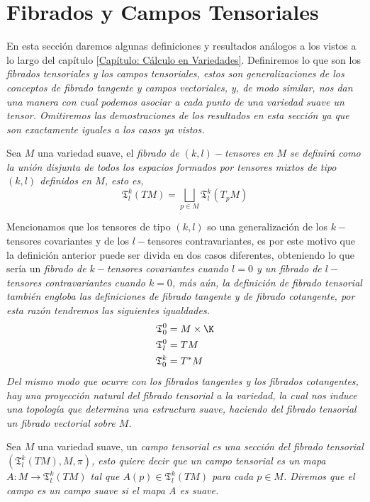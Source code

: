 \section{Fibrados y Campos Tensoriales}\label{Sección: Campos Tensoriales}
En esta sección daremos algunas definiciones y resultados análogos a los
vistos a lo largo del capítulo \ref{Capítulo: Cálculo en Variedades}.
Definiremos lo que son los \it{fibrados tensoriales} y los \it{campos
	tensoriales}, estos son generalizaciones de los conceptos de fibrado tangente y
campos vectoriales, y, de modo similar, nos dan una manera con cual podemos
asociar a cada punto de una variedad suave un tensor. Omitiremos las
demostraciones de los resultados en esta sección ya que son exactamente iguales
a los casos ya vistos.

\begin{definition}
	Sea $M$ una variedad suave, el \it{fibrado de $(k,l)-$tensores en
		$M$} se definirá como la unión disjunta de todos los espacios formados por
	tensores mixtos	de tipo $(k,l)$ definidos en $M$, esto es,
	\[
		\mathfrak{T}^{k}_{l}(TM) = \bigsqcup_{p \in M} \mathfrak{T}^{k}_{l}(T_{p}M)
	\]
\end{definition}

Mencionamos que los tensores de tipo $(k,l)$ so una generalización de los
$k-$tensores covariantes y de los $l-$tensores contravariantes, es por este
motivo que la definición anterior puede ser divida en dos casos diferentes,
obteniendo lo que sería un \it{fibrado de $k-$tensores covariantes} cuando $l=0$
y un \it{fibrado de $l-$tensores contravariantes} cuando $k=0$, más aún, la
definición de fibrado tensorial también engloba las definiciones de fibrado
tangente y de fibrado cotangente, por esta razón tendremos las siguientes
igualdades.
\begin{align*}
	\mathfrak{T}^{0}_{0} & = M \times \K \\
	\mathfrak{T}^{0}_{l} & = TM          \\
	\mathfrak{T}^{k}_{0} & = T^{*}M
\end{align*}
Del mismo modo que ocurre con los fibrados tangentes y los fibrados cotangentes,
hay una proyección natural del fibrado tensorial a la variedad, la cual nos
induce una topología que determina una estructura suave, haciendo del
fibrado tensorial un fibrado vectorial sobre $M$.

\begin{definition}
	Sea $M$ una variedad suave, un \it{campo tensorial} es una sección del fibrado
	tensorial $(\mathfrak{T}^{k}_{l}(TM), M, \pi)$, esto quiere decir que un campo
	tensorial es un mapa $A: M \to \mathfrak{T}^{k}_{l}(TM)$ tal que $A(p) \in
		\mathfrak{T}^{k}_{l}(TM)$ para cada $p \in M$. Diremos que el campo es un
	\it{campo suave} si el mapa $A$ es suave.
\end{definition}

